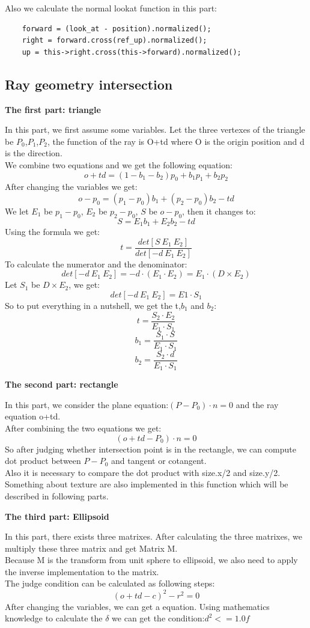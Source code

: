 \documentclass[acmtog]{acmart}
\begin{document}
Also we calculate the normal lookat function in this part: \\
\begin{lstlisting}
    forward = (look_at - position).normalized();
    right = forward.cross(ref_up).normalized();
    up = this->right.cross(this->forward).normalized();
\end{lstlisting}

\subsection{Ray geometry intersection}

\textbf{The first part: triangle}

In this part, we first assume some variables. Let the three vertexes of the triangle be $P_0$,$P_1$,$P_2$, the function of the ray is O+td where O is the origin position and d is the direction. \\
We combine two equations and we get the following equation: \\
$$o+td=(1-b_1-b_2)p_0+b_1p_1+b_2p_2$$
After changing the variables we get:
$$o-p_0=(p_1-p_0)b_1+(p_2-p_0)b_2-td$$
We let $E_1$ be $p_1-p_0$, $E_2$ be $p_2-p_0$, $S$ be $o-p_0$, then it changes to:
$$S=E_1b_1+E_2b_2-td$$
Using the formula we get:
$$t=\frac{det[S~E_1~E_2]}{det[-d~E_1~E_2]}$$
To calculate the numerator and the denominator:
$$det [-d~E_1~E_2]=-d \cdot (E_1 \cdot E_2)=E_1 \cdot(D\times E_2)$$
Let $S_1$ be $D\times E_2$, we get:
$$det [-d~E_1~E_2]=E1\cdot S_1$$
So to put everything in a nutshell, we get the t,$b_1$ and $b_2$:
$$t=\frac{S_2 \cdot E_2}{E_1 \cdot S_1}$$
$$b_1=\frac{S_1 \cdot S}{E_1 \cdot S_1}$$
$$b_2=\frac{S_2 \cdot d}{E_1 \cdot S_1}$$

\textbf{The second part: rectangle}

In this part, we consider the plane equation:$(P-P_0)\cdot n=0$ and the ray equation o+td. \\
After combining the two equations we get:
$$(o+td-P_0)\cdot n=0$$
So after judging whether intersection point is in the rectangle, we can compute dot product between $P-P_0$ and tangent or cotangent.\\
Also it is necessary to compare the dot product with size.x/2 and size.y/2.\\
Something about texture are also implemented in this function which will be described in following parts. 

\textbf{The third part: Ellipsoid}

In this part, there exists three matrixes. After calculating the three matrixes, we multiply these three matrix and get Matrix M. \\
Because M is the transform from unit sphere to ellipsoid, we also need to apply the inverse implementation to the matrix. \\
The judge condition can be calculated as following steps: \\
$$(o+td-c)^2-r^2 = 0$$
After changing the variables, we can get a equation. Using mathematics knowledge to calculate the $\delta$ we can get the condition:$d^2 <= 1.0f$
\end{document}
